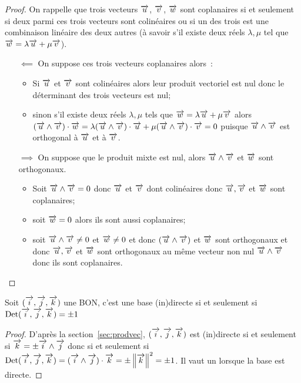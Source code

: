 \begin{proof}
  On rappelle que trois vecteurs \(\vu\), \(\vv\), \(\vw\) sont coplanaires si
  et seulement si deux parmi ces trois vecteurs sont colinéaires ou si un des
  trois est une combinaison linéaire des deux autres (à savoir s'il existe
  deux réels \(\lambda, \mu\) tel que \(\vw = \lambda\vu + \mu\vv\)).
  \begin{itemize}
    \item[\(\impliedby\)] On suppose ces trois vecteurs coplanaires alors~:
      \begin{itemize}
        \item Si \(\vu\) et \(\vv\) sont colinéaires alors leur produit
          vectoriel est nul donc le déterminant des trois vecteurs est nul;
        \item sinon s'il existe deux réels \(\lambda, \mu\) tels que \(\vw =
          \lambda\vu + \mu\vv\) alors \((\vu\wedge\vv)\cdot\vw =
          \lambda(\vu\wedge\vv)\cdot\vu + \mu(\vu\wedge\vv)\cdot\vv = 0\)
          puisque \(\vu\wedge\vv\) est orthogonal à \(\vu\) et à \(\vv\).
      \end{itemize}
    \item[\(\implies\)] On suppose que le produit mixte est nul, alors
      \(\vu\wedge\vv\) et \(\vw\) sont orthogonaux.  \begin{itemize}
        \item Soit \(\vu\wedge\vv = 0\) donc \(\vu\) et \(\vv\) dont
          colinéaires donc \(\vu, \vv\) et \(\vw\) sont coplanaires;
        \item soit \(\vw = 0\) alors ils sont aussi coplanaires;
        \item soit \(\vu\wedge\vv \neq 0\) et \(\vw\neq 0\) et donc
          \((\vu\wedge\vv)\) et \(\vw\) sont \og orthogonaux \fg{} et donc
          \(\vu, \vv\) et \(\vw\) sont orthogonaux au même vecteur non nul
          \(\vu\wedge\vv\) donc ils sont coplanaires.
      \end{itemize}
  \end{itemize}
\end{proof}

\begin{prop}
  Soit \(\bondtrois\) une BON, c'est une base (in)directe si et seulement si
  \(\Det\bondtrois = \pm 1\)
\end{prop}

\begin{proof}
  D'après la section~\ref{sec:prodvec}, \(\bondtrois\) est (in)directe si et
  seulement si \(\vk = \pm\vi\wedge\vj\) donc si et seulement si
  \(\Det\bondtrois = (\vi\wedge\vj)\cdot\vk = \pm\norme{\vk}^2 = \pm 1\). Il
  vaut un lorsque la base est directe.
\end{proof}

